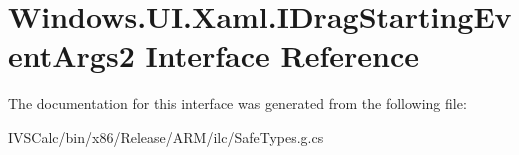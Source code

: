 \hypertarget{interface_windows_1_1_u_i_1_1_xaml_1_1_i_drag_starting_event_args2}{}\section{Windows.\+U\+I.\+Xaml.\+I\+Drag\+Starting\+Event\+Args2 Interface Reference}
\label{interface_windows_1_1_u_i_1_1_xaml_1_1_i_drag_starting_event_args2}


The documentation for this interface was generated from the following file\+:\begin{DoxyCompactItemize}
\item 
I\+V\+S\+Calc/bin/x86/\+Release/\+A\+R\+M/ilc/Safe\+Types.\+g.\+cs\end{DoxyCompactItemize}

